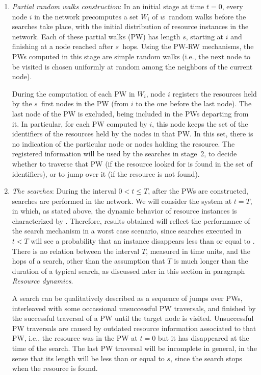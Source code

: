 \documentclass[]{elsarticle}
\newcommand{\s}		{\ensuremath{s}}		\newcommand{\sopt}	{\ensuremath{s_{opt}}}		\newcommand{\p}		{\ensuremath{p}}		\newcommand{\W}		{\ensuremath{W}}		\newcommand{\w}		{\ensuremath{w}}		\newcommand{\lsave}	{\ensuremath{\overline{l}_s}}	\newcommand{\lave}	{\ensuremath{\overline{l}}}	\newcommand{\lopt}	{\ensuremath{\overline{l}_{opt}}}
\begin{document}
\begin{enumerate}
\label{point1}
\item
\emph{Partial random walks construction}: In an initial stage at time $t\!=\!0$, every node $i$ in the network precomputes a set $\W_i$ of \w\ random walks before the searches take place, with the initial distribution of resource instances in the network. Each of these partial walks (PW) has length \s, starting at $i$ and finishing at a node reached after \s\ hops. Using the PW-RW mechanisms, the PWs computed in this stage are simple random walks (i.e., the next node to be visited is chosen uniformly at random among the neighbors of the current node).

During the computation of each PW in $\W_i$, node $i$ registers the resources held by the \s\ first nodes in the PW (from $i$ to the one before the last node). The last node of the PW is excluded, being included in the PWs departing from it. 
In particular, for each PW computed by $i$, this node keeps the set of the identifiers of the resources held by the nodes in that PW. In this set, there is no indication of the particular node or nodes holding the resource.
The registered information will be used by the searches in stage~2,
to decide whether to traverse that PW (if the resource looked for is found in the set of identifiers), or to jump over it (if the resource is not found).

\item
\label{point2}
\emph{The searches}: During the interval $0 < t \leq T$, after the PWs are constructed, searches are performed in the network. We will consider the system at $t\!=\!T$, in which, as stated above, the dynamic behavior of resource instances is characterized by \pd. Therefore, results obtained will reflect the performance of the search mechanism in a worst case scenario, since searches executed in $t < T$ will see a probability that an instance disappears less than or equal to \pd.
There is no relation between the interval $T$, measured in time units, and the hops of a search, other than the assumption that $T$ is much longer than the duration of a typical search, as discussed later in this section in paragraph \emph{Resource dynamics}. 

A search can be qualitatively described as a sequence of jumps over PWs, interleaved with some occassional unsuccessful PW traversals, and finished by the successful traversal of a PW until the target node is visited. 
Unsuccessful PW traversals are caused by outdated resource information associated to that PW, i.e., the resource was in the PW at $t=0$ but it has disappeared at the time of the search.
The last PW traversal will be incomplete in general, in the sense that its length will be less than or equal to \s, since the search stops when the resource is found. 


\end{enumerate}
\end{document}
